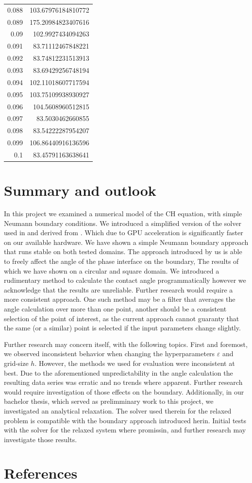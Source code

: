 \documentclass{mimosis}
\begin{document}
\begin{longtable}{rr}
0.088 & 103.67976184810772\\
0.089 & 175.20984823407616\\
0.09 & 102.9927434094263\\
0.091 & 83.71112467848221\\
0.092 & 83.74812231513913\\
0.093 & 83.69429256748194\\
0.094 & 102.11018607717594\\
0.095 & 103.75109938930927\\
0.096 & 104.5608960512815\\
0.097 & 83.5030462660855\\
0.098 & 83.54222287954207\\
0.099 & 106.86440916136596\\
0.1 & 83.45791163638641\\
\end{longtable}
\chapter{Summary and outlook}
\label{sec:orgc8de93d}
In this project we examined a numerical model of the CH equation, with simple Neumann boundary conditions. We introduced a simplified version of the solver used in \autocite{Ulmer_CHRelaxed_2024} and derived from \autocite{SHIN20117441}. Which due to GPU acceleration is significantly faster on our available hardware. We have shown a simple Neumann boundary approach that runs stable on both tested domains. The approach introduced by us is able to freely affect the angle of the phase interface on the boundary, The results of which we have shown on a circular and square domain. We introduced a rudimentary method to calculate the contact angle programmatically however we acknowledge that the results are unreliable. Further research would require a more consistent approach. One such method may be a filter that averages the angle calculation over more than one point, another should be a consistent selection of the point of interest, as the current approach cannot guaranty that the same (or a similar) point is selected if the input parameters change slightly.

Further research may concern itself, with the following topics. First and foremost, we observed inconsistent behavior when changing the hyperparameters \(\varepsilon\) and grid-size \(h\). However, the methods we used for evaluation were inconsistent at best. Due to the aforementioned unpredictability in the angle calculation the resulting data series was erratic and no trends where apparent. Further research would require investigation of those effects on the boundary. Additionally, in our bachelor thesis, which served as prelimminary work to this project, we investigated an analytical relaxation. The solver used therein for the relaxed problem is compatible with the boundary approach introduced herin. Initial tests with the solver for the relaxed system where promissin, and further research may investigate those results.
\chapter{References}
\label{sec:orgcea2f42}
\printbibliography
\end{document}
